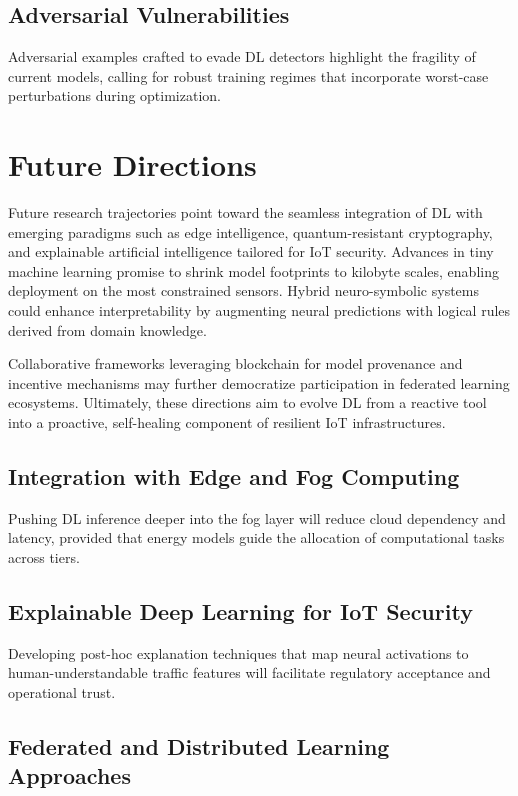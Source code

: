 \documentclass[12pt]{article}
\begin{document}
\subsection{Adversarial Vulnerabilities}

Adversarial examples crafted to evade DL detectors highlight the fragility of current models, calling for robust training regimes that incorporate worst-case perturbations during optimization.

\section{Future Directions}

Future research trajectories point toward the seamless integration of DL with emerging paradigms such as edge intelligence, quantum-resistant cryptography, and explainable artificial intelligence tailored for IoT security. Advances in tiny machine learning promise to shrink model footprints to kilobyte scales, enabling deployment on the most constrained sensors. Hybrid neuro-symbolic systems could enhance interpretability by augmenting neural predictions with logical rules derived from domain knowledge.

Collaborative frameworks leveraging blockchain for model provenance and incentive mechanisms may further democratize participation in federated learning ecosystems. Ultimately, these directions aim to evolve DL from a reactive tool into a proactive, self-healing component of resilient IoT infrastructures.

\subsection{Integration with Edge and Fog Computing}

Pushing DL inference deeper into the fog layer will reduce cloud dependency and latency, provided that energy models guide the allocation of computational tasks across tiers.

\subsection{Explainable Deep Learning for IoT Security}

Developing post-hoc explanation techniques that map neural activations to human-understandable traffic features will facilitate regulatory acceptance and operational trust.

\subsection{Federated and Distributed Learning Approaches}
\end{document}
